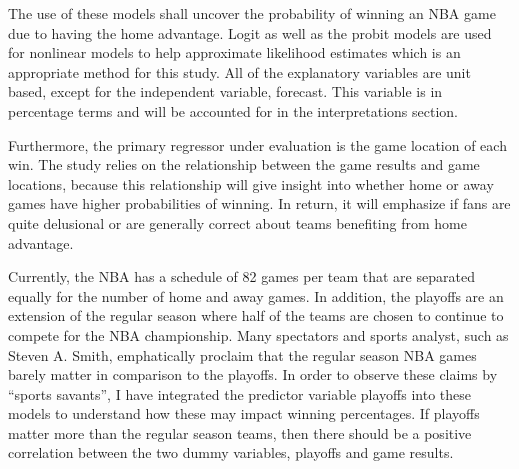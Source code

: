 \documentclass[12pt,english]{article}
\begin{document}
The use of these models shall uncover the probability of winning an NBA game due to having the home advantage. Logit as well as the probit models are used for nonlinear models to help approximate likelihood estimates which is an appropriate method for this study. All of the explanatory variables are unit based, except for the independent variable, forecast. This variable is in percentage terms and will be accounted for in the interpretations section. 
\par Furthermore, the primary regressor under evaluation is the game location of each win. The study relies on the relationship between the game results and game locations, because this relationship will give insight into whether home or away games have higher probabilities of winning. In return, it will emphasize if fans are quite delusional or are generally correct about teams benefiting from home advantage. 
\par Currently, the NBA has a schedule of 82 games per team that are separated equally for the number of home and away games. In addition, the playoffs are an extension of the regular season where half of the teams are chosen to continue to compete for the NBA championship. Many spectators and sports analyst, such as Steven A. Smith, emphatically proclaim that the regular season NBA games barely matter in comparison to the playoffs. In order to observe these claims by “sports savants”, I have integrated the predictor variable playoffs into these models to understand how these may impact winning percentages. If playoffs matter more than the regular season teams, then there should be a positive correlation between the two dummy variables, playoffs and game results. 
\end{document}
